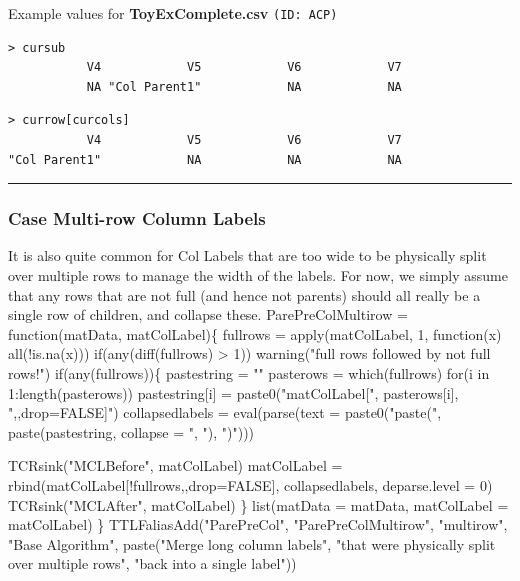 \documentclass[a4paper]{article}
\begin{document}
Example values for \textbf{ToyExComplete.csv} \texttt{(ID: ACP)}
\begin{verbatim}
> cursub
           V4            V5            V6            V7 
           NA "Col Parent1"            NA            NA 
\end{verbatim}
\begin{verbatim}
> currow[curcols]
           V4            V5            V6            V7 
"Col Parent1"            NA            NA            NA 
\end{verbatim}
\vspace{-1.5em}
\noindent\rule{0.25\textwidth}{0.4pt}
\vspace{0.5em}

\subsubsection{Case Multi-row Column Labels}
It is also quite common for Col Labels that are too wide to be
physically split over multiple rows to manage the width of the
labels. For now, we simply assume that any rows that are not full (and
hence not parents) should all really be a single row of children, and
collapse these.
\nwenddocs{}\endmoddef
ParePreColMultirow =
  function(matData, matColLabel)\{
    fullrows = apply(matColLabel, 1, function(x) all(!is.na(x)))
    if(any(diff(fullrows) > 1))
      warning("full rows followed by not full rows!")
    if(any(fullrows))\{
      pastestring = ""
      pasterows = which(fullrows)
      for(i in 1:length(pasterows))
        pastestring[i] = paste0("matColLabel[", pasterows[i],
                     ",,drop=FALSE]")
      collapsedlabels =
        eval(parse(text = paste0("paste(",
                     paste(pastestring, collapse = ", "), ")")))

      TCRsink("MCLBefore", matColLabel)
      matColLabel = rbind(matColLabel[!fullrows,,drop=FALSE],
        collapsedlabels, deparse.level = 0)
      TCRsink("MCLAfter", matColLabel)
    \}
    list(matData = matData, matColLabel = matColLabel)
  \}
TTLFaliasAdd("ParePreCol", "ParePreColMultirow", "multirow",
             "Base Algorithm", paste("Merge long column labels",
             "that were physically split over multiple rows",
             "back into a single label"))
\nwendcode{}\nwdocspar
\end{document}
